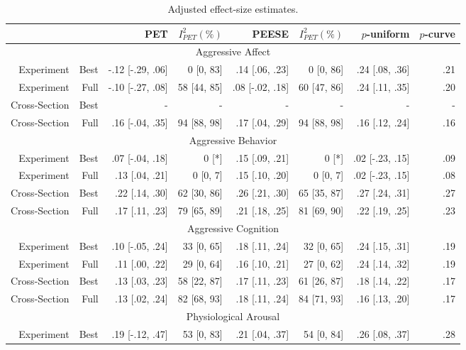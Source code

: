\documentclass[man, mask]{apa6}
\begin{document}
\begin{table}[htbp]
	\centering
	\caption{Adjusted effect-size estimates.}
	    \begin{tabular}{rrrrrrrr}
	    	\toprule
	    	&       & PET   & $I^2_{PET} (\%)$ & PEESE & $I^2_{PET} (\%)$ & $p$-uniform & $p$-curve \\
	    	\midrule
	    	\multicolumn{8}{c}{Aggressive Affect} \\
	    	Experiment & Best  & -.12 [-.29, .06] & 0 [0, 83] & .14 [.06, .23] &  0 [0, 86] & .24 [.08, .36] & .21 \\
	    	Experiment & Full  & -.10 [-.27, .08] & 58 [44, 85] & .08 [-.02, .18] & 60 [47, 86] & .24 [.11, .35] & .20 \\
	    	Cross-Section & Best  & -     & -     & -     & -     & -     & - \\
	    	Cross-Section & Full  &  .16 [-.04, .35] & 94 [88, 98] & .17 [.04, .29] & 94 [88, 98] & .16 [.12, .24] & .16 \\
	    	\multicolumn{8}{c}{Aggressive Behavior} \\
	    	Experiment & Best  &  .07 [-.04, .18] &  0 [*] & .15 [.09, .21] &  0 [*] & .02 [-.23, .15] & .09 \\
	    	Experiment & Full  &  .13 [.04, .21] & 0 [0, 7] & .15 [.10, .20] & 0 [0, 7] & .02 [-.23, .15] & .08 \\
	    	Cross-Section & Best  &  .22 [.14, .30] & 62 [30, 86] & .26 [.21, .30] & 65 [35, 87] & .27 [.24, .31] & .27 \\
	    	Cross-Section & Full  &  .17 [.11, .23] & 79 [65, 89] & .21 [.18, .25] & 81 [69, 90] & .22 [.19, .25] & .23 \\
	    	\multicolumn{8}{c}{Aggressive Cognition} \\
	    	Experiment & Best  &  .10 [-.05, .24] & 33 [0, 65] & .18 [.11, .24] & 32 [0, 65] & .24 [.15, .31] & .19 \\
	    	Experiment & Full  &  .11 [.00, .22] & 29 [0, 64] & .16 [.10, .21] & 27 [0, 62] & .24 [.14, .32] & .19 \\
	    	Cross-Section & Best  &  .13 [.03, .23] & 58 [22, 87] & .17 [.11, .23] & 61 [26, 87] & .18 [.14, .22] & .17 \\
	    	Cross-Section & Full  &  .13 [.02, .24] & 82 [68, 93] & .18 [.11, .24] & 84 [71, 93] & .16 [.13, .20] & .17 \\
	    	\multicolumn{8}{c}{Physiological Arousal} \\
	    	Experiment & Best  &  .19 [-.12, .47] & 53 [0, 83] & .21 [.04, .37] & 54 [0, 84] & .26 [.08, .37] & .28 \\

\end{tabular}
\end{table}
\end{document}
